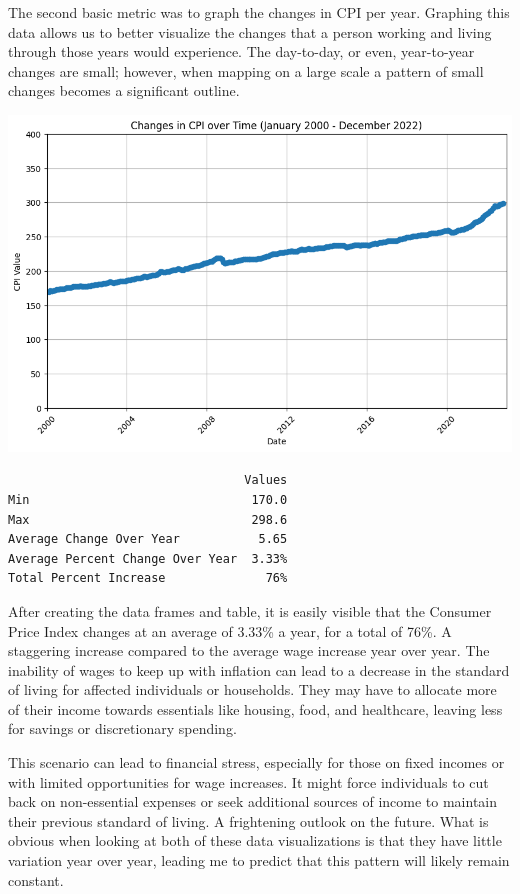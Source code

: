 \documentclass[
  letterpaper,
  DIV=11,
  numbers=noendperiod]{scrartcl}
\begin{document}
The second basic metric was to graph the changes in CPI per year.
Graphing this data allows us to better visualize the changes that a
person working and living through those years would experience. The
day-to-day, or even, year-to-year changes are small; however, when
mapping on a large scale a pattern of small changes becomes a
significant outline.

\includegraphics{Markdown_files/figure-pdf/cell-5-output-1.png}

\begin{verbatim}
                                 Values
Min                               170.0
Max                               298.6
Average Change Over Year           5.65
Average Percent Change Over Year  3.33%
Total Percent Increase              76%
\end{verbatim}

After creating the data frames and table, it is easily visible that the
Consumer Price Index changes at an average of 3.33\% a year, for a total
of 76\%. A staggering increase compared to the average wage increase
year over year. The inability of wages to keep up with inflation can
lead to a decrease in the standard of living for affected individuals or
households. They may have to allocate more of their income towards
essentials like housing, food, and healthcare, leaving less for savings
or discretionary spending.

This scenario can lead to financial stress, especially for those on
fixed incomes or with limited opportunities for wage increases. It might
force individuals to cut back on non-essential expenses or seek
additional sources of income to maintain their previous standard of
living. A frightening outlook on the future. What is obvious when
looking at both of these data visualizations is that they have little
variation year over year, leading me to predict that this pattern will
likely remain constant.
\end{document}
